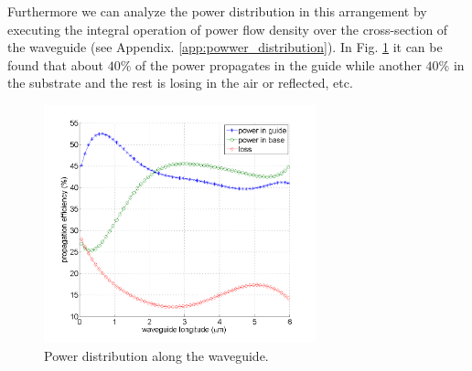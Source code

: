 Furthermore we can analyze the power distribution in this arrangement by executing the integral operation of power flow density over the cross-section of the waveguide (see Appendix. \ref{app:powwer_distribution}).  In Fig. \ref{fig:power_distribution} it can be found that about $40\%$ of the power propagates in the guide while another $40\%$ in the substrate and the rest is losing in the air or reflected, etc.
\begin{figure}[!ht]
\centering
\includegraphics[width=0.7\textwidth]{bilder/power_distribution1}
\caption{Power distribution along the waveguide.}
\label{fig:power_distribution}
\end{figure}
